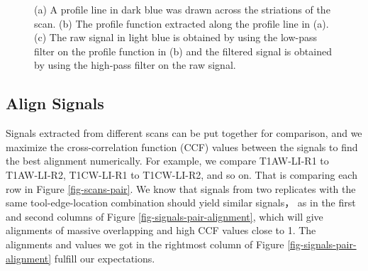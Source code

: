 \documentclass[fleqn,10pt]{wlscirep}
\begin{document}
\begin{figure}
\begin{minipage}{0.50\linewidth}
{}

\subcaption{\label{fig-T1AW-LI-R1-signals-plot}}

\end{minipage}%

\caption{\label{fig-T1AW-LI-R1-profiles-signals}(a) A profile line in
dark blue was drawn across the striations of the scan. (b) The profile
function extracted along the profile line in (a). (c) The raw signal in
light blue is obtained by using the low-pass filter on the profile
function in (b) and the filtered signal is obtained by using the
high-pass filter on the raw signal.}

\end{figure}%

\subsection*{Align Signals}\label{sec-align-signals}

Signals extracted from different scans can be put together for
comparison, and we maximize the cross-correlation function (CCF) values
between the signals to find the best alignment numerically. For example,
we compare T1AW-LI-R1 to T1AW-LI-R2, T1CW-LI-R1 to T1CW-LI-R2, and so
on. That is comparing each row in Figure \ref{fig-scans-pair}. We know
that signals from two replicates with the same tool-edge-location
combination should yield similar signals， as in the first and second
columns of Figure \ref{fig-signals-pair-alignment}, which will give
alignments of massive overlapping and high CCF values close to 1. The
alignments and values we got in the rightmost column of Figure
\ref{fig-signals-pair-alignment} fulfill our expectations.
\end{document}
